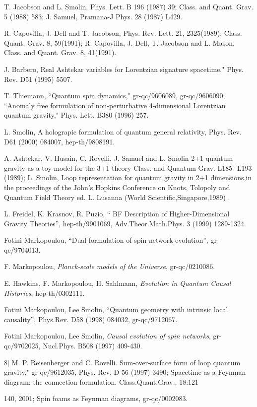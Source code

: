 \documentclass[12pt]{article}
\begin{document}
\begin{thebibliography}{0}
{T. Jacobson and L. Smolin,
Phys. Lett. B 196 (1987) 39; Class. and Quant. Grav. 5 (1988) 583;
J. Samuel, Pramana-J Phys. 28 (1987) L429.

R. Capovilla, J. Dell and T. Jacobson, Phys. Rev. Lett. 21,
2325(1989); Class. Quant.
Grav. 8, 59(1991); R. Capovilla, J. Dell, T. Jacobson and L. Mason,
Class. and Quant. Grav. 8, 41(1991).


J. Barbero, Real
Ashtekar variables for Lorentzian
signature spacetime,"
Phys. Rev. D51 (1995) 5507.

T. Thiemann, ``Quantum spin dynamics," gr-qc/9606089,
gr-qc/9606090;
``Anomaly free formulation of non-perturbative 4-dimensional Lorentzian
quantum gravity," Phys. Lett. B380 (1996) 257.

L. Smolin, A holograpic formulation of quantum
general relativity, Phys. Rev. D61
(2000) 084007, hep-th/9808191.

A. Ashtekar, V. Husain, C. Rovelli, J. Samuel and L.
Smolin 2+1 quantum
gravity as a toy model for the 3+1 theory Class. and Quantum Grav. L185-
L193 (1989); L. Smolin, Loop representation
for quantum gravity in 2+1 dimensions,in the proceedings of the John's
Hopkins Conference on Knots, Tolopoly and Quantum Field Theory ed. L.
Lusanna (World Scientific,Singapore,1989) .

 L. Freidel, K. Krasnov, R. Puzio,
`` BF Description of Higher-Dimensional Gravity Theories'',
hep-th/9901069, Adv.Theor.Math.Phys. 3 (1999) 1289-1324.

Fotini Markopoulou, ``Dual formulation of spin network
evolution'', gr-qc/9704013.

F. Markopoulou, 
{\it Planck-scale models of the Universe}, 
gr-qc/0210086.

E. Hawkins, F. Markopoulou, H. Sahlmann,
{\it Evolution in Quantum Causal Histories},
hep-th/0302111.

Fotini Markopoulou, Lee Smolin,
``Quantum geometry with intrinsic local causality'', Phys.Rev. D58 (1998)
084032,  gr-qc/9712067.

Fotini Markopoulou, Lee Smolin,
{\it Causal evolution of spin networks}, 
gr-qc/9702025, Nucl.Phys. B508 (1997) 409-430.


8] M. P. Reisenberger and C. Rovelli. Sum-over-surface
form of loop quantum
gravity," gr-qc/9612035, Phys. Rev. D 56 (1997) 3490; Spacetime as a
Feynman diagram:
the connection formulation. Class.Quant.Grav., 18:121{140, 2001;
Spin foams as Feynman diagrams, gr-qc/0002083.

}}
\end{thebibliography}
\end{document}
